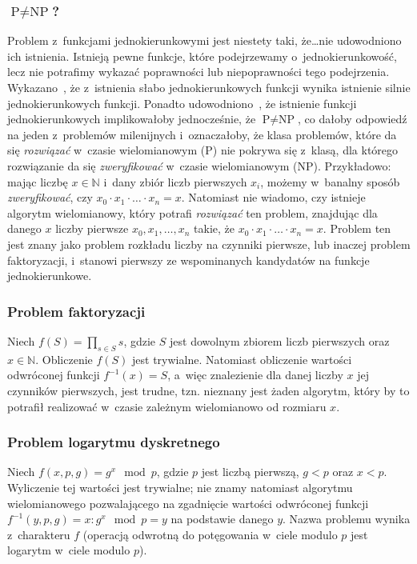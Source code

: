\documentclass[12pt,a4paper,twoside]{article}
\begin{document}
\subsubsection{$\textrm{P} \neq \textrm{NP}$?}
Problem z~funkcjami jednokierunkowymi jest niestety taki, że\ldots nie
udowodniono~\cite{one_way_functions_existence} ich istnienia. Istnieją pewne
funkcje, które podejrzewamy o~jednokierunkowość, lecz nie potrafimy wykazać
poprawności lub niepoprawności tego podejrzenia.
Wykazano~\cite{one_way_functions}, że z~istnienia słabo jednokierunkowych
funkcji wynika istnienie silnie jednokierunkowych funkcji. Ponadto
udowodniono~\cite{one_way_functions}, że istnienie funkcji jednokierunkowych
implikowałoby jednocześnie, że $\textrm{P} \neq \textrm{NP}$, co dałoby
odpowiedź na jeden z~problemów milenijnych i~oznaczałoby, że klasa problemów,
które da się \emph{rozwiązać} w~czasie wielomianowym ($\textrm{P}$) nie pokrywa
się z~klasą, dla którego rozwiązanie da się \emph{zweryfikować} w~czasie
wielomianowym ($\textrm{NP}$). Przykładowo: mając liczbę $x \in \mathbb{N}$
i~dany zbiór liczb pierwszych $x_i$, możemy w~banalny sposób
\emph{zweryfikować}, czy $x_0 \cdot x_1 \cdot \ldots \cdot x_n = x$. Natomiast
nie wiadomo, czy istnieje algorytm wielomianowy, który potrafi \emph{rozwiązać}
ten problem, znajdując dla danego $x$ liczby pierwsze $x_0, x_1, \ldots, x_n$
takie, że $x_0 \cdot x_1 \cdot \ldots \cdot x_n = x$. Problem ten jest znany
jako problem rozkładu liczby na czynniki pierwsze, lub inaczej problem
faktoryzacji, i~stanowi pierwszy ze wspominanych kandydatów na funkcje
jednokierunkowe.



\subsubsection{Problem faktoryzacji}
Niech $f(S) = \prod_{s \in S} s$, gdzie $S$ jest dowolnym zbiorem liczb
pierwszych oraz $x \in \mathbb{N}$. Obliczenie $f(S)$ jest trywialne. Natomiast
obliczenie wartości odwróconej funkcji $f^{-1}(x)=S$, a~więc znalezienie dla
danej liczby $x$ jej czynników pierwszych, jest trudne, tzn. nieznany jest
żaden algorytm, który by to potrafił realizować w~czasie zależnym wielomianowo
od rozmiaru $x$.



\subsubsection{Problem logarytmu dyskretnego}
Niech $f(x, p, g) = g^x \mod p$, gdzie $p$ jest liczbą pierwszą, $g < p$ oraz
$x < p$. Wyliczenie tej wartości jest trywialne; nie znamy natomiast algorytmu
wielomianowego pozwalającego na zgadnięcie wartości odwróconej funkcji
\mbox{$f^{-1}(y, p, g) = x : g^x \mod p = y$} na podstawie danego $y$. Nazwa
problemu wynika z~charakteru $f$ (operacją odwrotną do potęgowania w~ciele
modulo $p$ jest logarytm w~ciele modulo $p$).
\end{document}
